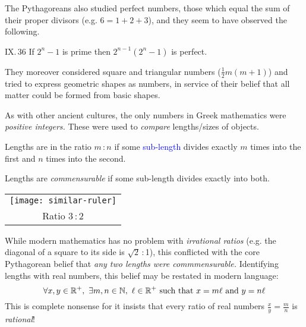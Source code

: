 The Pythagoreans also studied perfect numbers, those which equal the sum of their proper divisors (e.g. $6=1+2+3$), and they seem to have observed the following.

\begin{thm*}{IX.\,36}{}
If $2^n-1$ is prime then $2^{n-1}(2^n-1)$ is perfect.
\end{thm*}

They moreover considered square and triangular numbers ($\frac 12m(m+1)$) and tried to express geometric shapes as numbers, in service of their belief that all matter could be formed from basic shapes.%
\vspace{-5pt}




As with other ancient cultures, the only numbers in Greek mathematics were \emph{positive integers.} These were used to \emph{compare} lengths/sizes of objects.

\begin{defn*}[lower separated=false, sidebyside, sidebyside align=top seam, sidebyside gap=0pt, righthand width=0.19\linewidth]{}{}
Lengths are in the ratio $m$\,:\,$n$ if some \textcolor{blue}{sub-length} divides exactly $m$ times into the first and $n$ times into the second.\par
Lengths are \emph{commensurable} if some sub-length divides exactly into both.
\tcblower
\flushright\begin{tabular}{c@{}}
\texttt{[image: similar-ruler]}\\
Ratio 3\,:\,2
\end{tabular}
\end{defn*}


While modern mathematics has no problem with \emph{irrational ratios} (e.g.{} the diagonal of a square to its side is $\sqrt 2$\,:\,1), this conflicted with the core Pythagorean belief that \emph{any two lengths were commmensurable.} Identifying lengths with real numbers, this belief may be restated in modern language:
\[\forall x,y\in\R^+,\ \exists m,n\in\N,\ \ell\in\R^+\ \text{such that}\ x=m\ell\ \text{and}\ y=n\ell\]
This is complete nonsense for it insists that every ratio of real numbers $\frac xy=\frac mn$ is \emph{rational}!\smallbreak


